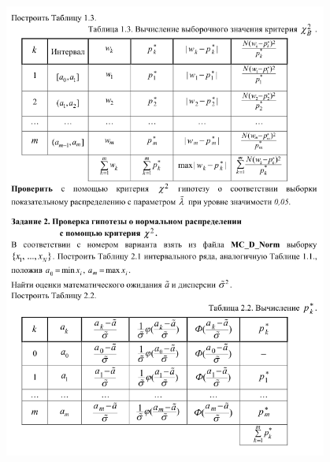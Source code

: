 \begin{figure}[p]%
\centering%
\includegraphics[width=0.95\textwidth]{../latex/inc/generated/img/task2.png}%
\end{figure}
\clearpage

